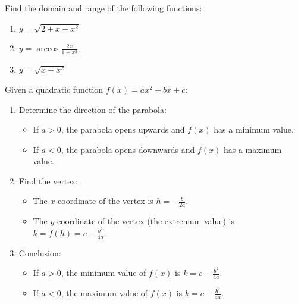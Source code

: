\begin{exercise}
Find the domain and range of the following functions:
\begin{enumerate}
    \item \( y = \sqrt{2 + x - x^2} \)
    \item \( y = \arccos \frac{2x}{1+x^2} \)
    \item \( y = \sqrt{x - x^2} \)
\end{enumerate}
\end{exercise}
\begin{remark}
    Given a quadratic function \( f(x) = ax^2 + bx + c \):

\begin{enumerate}
    \item Determine the direction of the parabola:
    \begin{itemize}
        \item If \( a > 0 \), the parabola opens upwards and \( f(x) \) has a minimum value.
        \item If \( a < 0 \), the parabola opens downwards and \( f(x) \) has a maximum value.
    \end{itemize}

    \item Find the vertex:
    \begin{itemize}
        \item The \( x \)-coordinate of the vertex is \( h = -\frac{b}{2a} \).
        \item The \( y \)-coordinate of the vertex (the extremum value) is \( k = f(h) = c - \frac{b^2}{4a} \).
    \end{itemize}
    
    \item Conclusion:
    \begin{itemize}
        \item If \( a > 0 \), the minimum value of \( f(x) \) is \( k = c - \frac{b^2}{4a} \).
        \item If \( a < 0 \), the maximum value of \( f(x) \) is \( k = c - \frac{b^2}{4a} \).
    \end{itemize}
\end{enumerate}
\end{remark}
